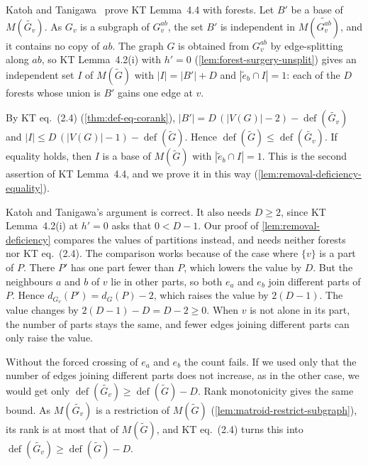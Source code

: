 \begin{remark}[On KT Lemma~4.4]
  \label{rem:kt-lemma-44}
  Katoh and Tanigawa~\cite[p.~662]{katohTanigawa2011} prove KT
  Lemma~4.4 with forests. Let $B'$ be a base of $M(\widetilde{G_v})$. As
  $G_v$ is a subgraph of $G_v^{ab}$, the set $B'$ is independent in
  $M(\widetilde{G_v^{ab}})$, and it contains no copy of $ab$. The graph
  $G$ is obtained from $G_v^{ab}$ by edge-splitting along $ab$, so KT
  Lemma~4.2(i) with $h' = 0$ (\cref{lem:forest-surgery-unsplit}) gives
  an independent set $I$ of $M(\tilde G)$ with $|I| = |B'| + D$ and
  $|\tilde e_b \cap I| = 1$: each of the $D$ forests whose union is $B'$
  gains one edge at $v$.

  By KT eq.~(2.4) (\cref{thm:def-eq-corank}),
  $|B'| = D\,(|V(G)| - 2) - \operatorname{def}(\widetilde{G_v})$ and
  $|I| \le D\,(|V(G)| - 1) - \operatorname{def}(\tilde G)$. Hence
  $\operatorname{def}(\tilde G) \le \operatorname{def}(\widetilde{G_v})$.
  If equality holds, then $I$ is a base of $M(\tilde G)$ with
  $|\tilde e_b \cap I| = 1$. This is the second assertion of KT
  Lemma~4.4, and we prove it in this way
  (\cref{lem:removal-deficiency-equality}).

  Katoh and Tanigawa's argument is correct. It also needs $D \ge 2$,
  since KT Lemma~4.2(i) at $h' = 0$ asks that $0 < D - 1$. Our proof of
  \cref{lem:removal-deficiency} compares the values of partitions
  instead, and needs neither forests nor KT eq.~(2.4). The comparison
  works because of the case where $\{v\}$ is a part of $P$. There $P'$
  has one part fewer than $P$, which lowers the value by $D$. But the
  neighbours $a$ and $b$ of $v$ lie in other parts, so both $e_a$ and
  $e_b$ join different parts of $P$. Hence
  $d_{G_v}(P') = d_G(P) - 2$, which raises the value by $2(D - 1)$. The
  value changes by $2(D - 1) - D = D - 2 \ge 0$. When $v$ is not alone in
  its part, the number of parts stays the same, and fewer edges joining
  different parts can only raise the value.

  Without the forced crossing of $e_a$ and $e_b$ the count fails. If we
  used only that the number of edges joining different parts does not
  increase, as in the other case, we would get only
  $\operatorname{def}(\widetilde{G_v}) \ge \operatorname{def}(\tilde G) - D$.
  Rank monotonicity gives the same bound. As $M(\widetilde{G_v})$ is a
  restriction of $M(\tilde G)$ (\cref{lem:matroid-restrict-subgraph}),
  its rank is at most that of $M(\tilde G)$, and KT eq.~(2.4) turns this
  into $\operatorname{def}(\widetilde{G_v}) \ge \operatorname{def}(\tilde G) - D$.
\end{remark}

